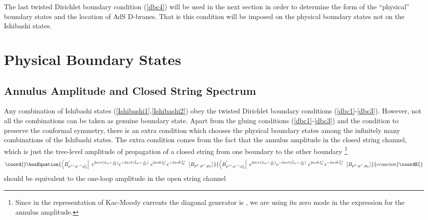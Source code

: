 \documentclass[a4paper,12pt]{article}
\begin{document}
The last twisted Dirichlet boundary condition (\ref{dbc4}) will be used in
the next section in order to determine the form of the ``physical'' boundary
states and the location of AdS\coordHE{} D-branes. That is this condition will
be imposed on the physical boundary states not on the Ishibashi states.

\section{Physical Boundary States}

\subsection{Annulus Amplitude and Closed String Spectrum}

Any combination of Ishibashi states
(\ref{Ishibashi1},\ref{Ishibashi2}) obey the twisted Dirichlet
boundary conditions (\ref{dbc1}-\ref{dbc3}). However, not all the
combinations can be taken as genuine boundary state. Apart from
the gluing conditions (\ref{dbc1}-\ref{dbc3}) and the condition to
preserve the conformal symmetry, there is an extra condition which
chooses the physical boundary states among the infinitely many
combinations of the Ishibashi states. The extra condition comes
from the fact that the annulus amplitude in the closed string
channel, which is just the tree-level amplitude of propagation of
a closed string from one boundary \coordHE{} to the other
boundary \coordHE{}\footnote{%
Since in the representation of Kac-Moody currents the diagonal generator is \coordHE{}, we are using its zero mode \coordHE{} in the expression for the
annulus amplitude.}
\begin{equation}\coord{}\boxEquation{
\left\langle B_{p^{+\prime },p^{-\prime },p_{2}^{\prime }}^{^{\prime
}}\right| \ e^{2\pi i\tau (L_{0}-\frac{c}{24})}e^{-2\pi i\bar{\tau}(\tilde{L}
_{0}-\frac{c}{24})}\ e^{2\pi i\theta J_{0}^{+}}e^{-2\pi i\bar{\theta}\tilde{J}
_{0}^{+}}\ \left| B_{p^{+},p^{-},p_{2}}\right\rangle  \label{annulus}
}{
\left\langle B_{p^{+\prime },p^{-\prime },p_{2}^{\prime }}^{^{\prime
}}\right| \ e^{2\pi i\tau (L_{0}-\frac{c}{24})}e^{-2\pi i\bar{\tau}(\tilde{L}
_{0}-\frac{c}{24})}\ e^{2\pi i\theta J_{0}^{+}}e^{-2\pi i\bar{\theta}\tilde{J}
_{0}^{+}}\ \left| B_{p^{+},p^{-},p_{2}}\right\rangle  }{ecuacion}\coordE{}\end{equation}
should be equivalent to the one-loop amplitude in the open string channel
\end{document}
